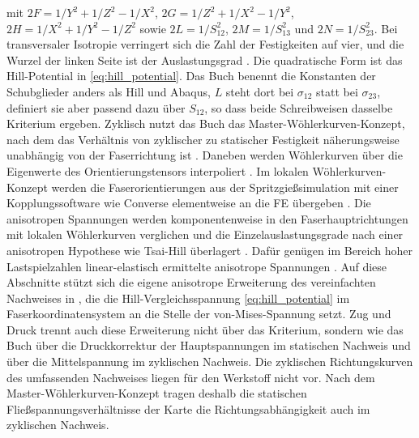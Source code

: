 mit $2F = 1/Y^{2} + 1/Z^{2} - 1/X^{2}$, $2G = 1/Z^{2} + 1/X^{2} - 1/Y^{2}$, $2H = 1/X^{2} + 1/Y^{2} - 1/Z^{2}$ sowie $2L = 1/S_{12}^{2}$, $2M = 1/S_{13}^{2}$ und $2N = 1/S_{23}^{2}$. Bei transversaler Isotropie verringert sich die Zahl der Festigkeiten auf vier, und die Wurzel der linken Seite ist der Auslastungsgrad \cite[S.~233]{Sto18}. Die quadratische Form ist das Hill-Potential in \eqref{eq:hill_potential}. Das Buch benennt die Konstanten der Schubglieder anders als Hill und Abaqus, $L$ steht dort bei $\sigma_{12}$ statt bei $\sigma_{23}$, definiert sie aber passend dazu über $S_{12}$, so dass beide Schreibweisen dasselbe Kriterium ergeben. Zyklisch nutzt das Buch das Master-Wöhlerkurven-Konzept, nach dem das Verhältnis von zyklischer zu statischer Festigkeit näherungsweise unabhängig von der Faserrichtung ist \cite[S.~236 bis 237]{Sto18}. Daneben werden Wöhlerkurven über die Eigenwerte des Orientierungstensors interpoliert \cite[S.~238 bis 239]{Sto18}. Im lokalen Wöhlerkurven-Konzept werden die Faserorientierungen aus der Spritzgießsimulation mit einer Kopplungssoftware wie Converse elementweise an die FE übergeben \cite[S.~241 bis 242]{Sto18}. Die anisotropen Spannungen werden komponentenweise in den Faserhauptrichtungen mit lokalen Wöhlerkurven verglichen und die Einzelauslastungsgrade nach einer anisotropen Hypothese wie Tsai-Hill überlagert \cite[S.~243]{Sto18}. Dafür genügen im Bereich hoher Lastspielzahlen linear-elastisch ermittelte anisotrope Spannungen \cite[S.~242]{Sto18}. Auf diese Abschnitte stützt sich die eigene anisotrope Erweiterung des vereinfachten Nachweises in , die die Hill-Vergleichsspannung \eqref{eq:hill_potential} im Faserkoordinatensystem an die Stelle der von-Mises-Spannung setzt. Zug und Druck trennt auch diese Erweiterung nicht über das Kriterium, sondern wie das Buch über die Druckkorrektur der Hauptspannungen im statischen Nachweis und über die Mittelspannung im zyklischen Nachweis. Die zyklischen Richtungskurven des umfassenden Nachweises liegen für den Werkstoff nicht vor. Nach dem Master-Wöhlerkurven-Konzept tragen deshalb die statischen Fließspannungsverhältnisse der Karte die Richtungsabhängigkeit auch im zyklischen Nachweis.


